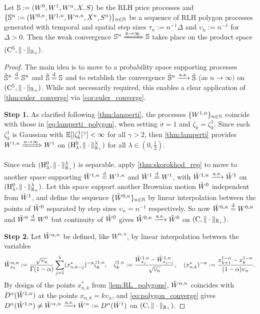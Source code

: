 \begin{theorem}\label{thm:rlh_convergence}
    Let $\mathbb{S}:=(W^0,W^1,W^\alpha,X,S)$ be the RLH price processes and $\{\mathbb{S}^n:=(W^{0,n},W^{1,n},W^{\alpha,n},X^n,S^n)\}_{n\in\mathbb{N}}$ be a sequence of RLH polygon processes generated with temporal and spatial step sizes $\tau_n:=n^{-1}\Delta$ and $\upsilon_n:=n^{-1}$ for $\Delta>0$. Then the weak convergence $\mathbb{S}^n\xRightarrow{n\to\infty}\mathbb{S}$ takes place on the product space $(\mathrm{C}^5,\Vert\cdot\Vert_{\mathbb{R}_+})$.
\end{theorem}
\begin{proof}
    The main idea is to move to a probability space supporting processes $\tilde{\mathbb{S}}^n\stackrel{\mathrm{d}}{=}\mathbb{S}^n$ and $\tilde{\mathbb{S}}\stackrel{\mathrm{d}}{=}\mathbb{S}$ and to establish the convergence $\tilde{\mathbb{S}}^n\xrightarrow{\mathrm{a.s.}}\tilde{\mathbb{S}}$ (as $n\to\infty)$ on $(\mathrm{C}^5,\Vert\cdot\Vert_{\mathbb{R}_+})$. While not necessarily required, this enables a clear application of \autoref{thm:euler_converge} via \autoref{cor:euler_converge}.

    \textbf{Step 1.} As clarified following \autoref{thm:lamperti}, the processes $\{W^{1,n}\}_{n\in\mathbb{N}}$ coincide with those in \autoref{eq:lamperti_polygon}, when setting $\sigma=1$ and $\zeta_k=\zeta^1_k$. Since each $\zeta^1_k$ is Gaussian with $\mathbb{E}[|\zeta^1_k|^\gamma]<\infty$ for all $\gamma>2$, then \autoref{thm:lamperti} provides $W^{1,n}\xRightarrow{n\to\infty} W^1$ on $(\mathrm{H}^0_\lambda,\Vert\cdot\Vert^\lambda_{\mathbb{R}_+})$ for all $\lambda\in(0,\frac12)$.

    Since each $(\mathrm{H}^0_\lambda,\Vert\cdot\Vert^\lambda_{\mathbb{R}_+})$ is separable, apply \autoref{thm:skorokhod_rep} to move to another space supporting $\tilde{W}^{1,n}\stackrel{\mathrm{d}}{=} W^{1,n}$ and $\tilde{W}^1\stackrel{\mathrm{d}}{=} W^1$, with $\tilde{W}^{1,n}\xrightarrow{\mathrm{a.s.}} \tilde{W}^1$ on $(\mathrm{H}^0_\lambda,\Vert\cdot\Vert^\lambda_{\mathbb{R}_+})$. Let this space support another Brownian motion $\tilde{W}^0$ independent from $\tilde{W}^1$, and define the sequence $\{\tilde{W}^{0,n}\}_{n\in\mathbb{N}}$ by linear interpolation between the points of $\tilde{W}^0$ separated by step sizes $\upsilon_n=n^{-1}$ respectively. So now $\tilde{W}^{0,n}\stackrel{\mathrm{d}}{=} W^{0,n}$ and $\tilde{W}^0\stackrel{\mathrm{d}}{=} W^0$ but continuity of $\tilde{W}^0$ gives $\tilde{W}^{0,n}\xrightarrow{\mathrm{a.s.}} \tilde{W}^0$ on $(\mathrm{C},\Vert\cdot\Vert_{\mathbb{R}_+})$.

    \textbf{Step 2.} Let $\tilde{W}^{\alpha,n}$ be defined, like $W^{\alpha,n}$, by linear interpolation between the variables
    \begin{equation}
        \tW^{\alpha,n}_{x_k} := \frac{\sqrt{\upsilon_n}}{\Gamma(1-\alpha)}\sum_{j=1}^k (x^*_{n,k-j})^{-\alpha}\tilde\zeta^{1,n}_k,\ \ \ \tilde\zeta^{1,n}_k:= \frac{\tW^{1,n}_{x_j} - \tW^{1,n}_{x_{j-1}}}{\sqrt{\upsilon_n}},\ \ \ (x^*_{n,k})^{-\alpha} := \frac{x_{k+1}^{1-\alpha} - x_k^{1-\alpha}}{(1-\alpha)\upsilon_n}.
    \end{equation}
    By design of the points $x^*_{n,k}$ from \autoref{lem:RL_polygons}, $\tilde{W}^{\alpha,n}$ coincides with $D^\alpha(\tilde{W}^{1,n})$ at the points $x_{n,k}=k\upsilon_n$, and \autoref{eq:polygon_converge} gives $D^\alpha(\tilde{W}^{1,n})\neq \tilde{W}^{\alpha,n} \xrightarrow{\mathrm{a.s.}} \tilde{W}^\alpha:=D^\alpha(\tilde{W}^1)$ on $(\mathrm{C},\Vert\cdot\Vert_{\mathbb{R}_+})$.


\end{proof}
